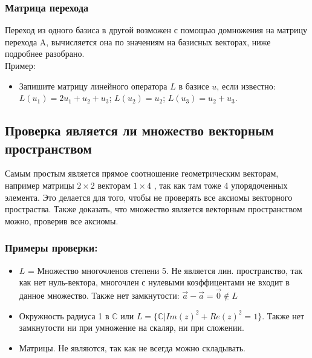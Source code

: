 \documentclass[12pt]{article}
\begin{document}
\subsubsection{Матрица перехода}
Переход из одного базиса в другой возможен с помощью домножения на матрицу перехода A, вычисляется она по значениям на базисных векторах, ниже подробнее разобрано.\\
Пример:
\begin{itemize}
    \item {Запишите матрицу линейного оператора $L$ в базисе $u$, если известно: $L(u_1) = 2u_1 + u_2 + u_3$; $L(u_2) = u_2$;
          $L(u_3) = u_2 + u_3$.}


\end{itemize}



\subsection{Проверка является ли множество векторным пространством}
Самым простым является прямое соотношение геометрическим векторам, например матрицы $2\times 2$ векторам $1\times 4$ , так как там тоже 4 упорядоченных элемента. Это делается для того, чтобы не проверять все аксиомы векторного простраства. Также доказать, что множество является векторным пространством можно, проверив все аксиомы.
\subsubsection{Примеры проверки:}
\begin{itemize}
    \item $L$ = \textbraceleft Множество многочленов степени 5\textbraceright . Не является лин. пространство, так как нет нуль-вектора, многочлен с нулевыми коэффицентами не входит в данное множество. Также нет замкнутости: $\overrightarrow{a}-\overrightarrow{a}=\overrightarrow{0} \notin L $
    \item Окружность радиуса 1 в $\mathbb{C}$ или $L = \{ \mathbb{C}  \vert  Im(z)^2+Re(z)^2 = 1 \} $. Также нет замкнутости ни при умножение на скаляр, ни при сложении.
    \item Матрицы. Не являются, так как не всегда можно складывать.

\end{itemize}
\end{document}
